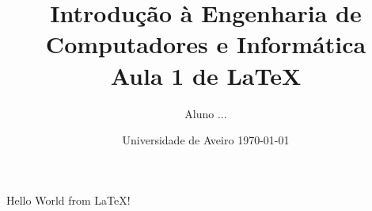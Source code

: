 \documentclass[]{report}
\title{\textbf{Introdução à Engenharia de Computadores e Informática \\ Aula 1 de \LaTeX}}
\author{Aluno ...}
\date{Universidade de Aveiro \today}
\begin{document}
\maketitle

Hello World from \LaTeX!
\end{document}
